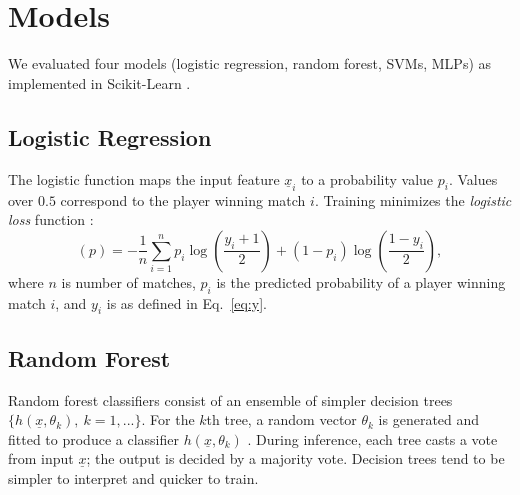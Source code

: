 \section{Models} \label{sec:models}

We evaluated four models (logistic regression, random forest, SVMs, MLPs) as implemented in  Scikit-Learn  \cite{pedregosa2011scikit}.

\subsection{Logistic Regression}
The logistic function maps the input feature $\underline{x}_i$ to a probability value $p_i$. Values over $0.5$ correspond to the player winning match $i$.  Training minimizes the \textit{logistic loss} function \cite{hazan2014logistic}:
\begin{equation}
    (p) = -\frac{1}{n} \sum_{i=1}^n p_i \log \left( \frac{y_i + 1}{2} \right) + (1-p_i)\log \left( \frac{1-y_i}{2} \right), 
\end{equation}
where $n$ is number of matches, $p_i$ is the predicted probability of a player winning match $i$, and  $y_i$ is as defined in Eq.~\ref{eq:y}. 


\subsection{Random Forest}
Random forest classifiers consist of an ensemble of simpler decision trees $\{h(\underline{x},\theta_k),\ k=1,...\}$. %
For the $k$th tree, a random vector $\theta_k$ is generated and fitted to produce a classifier $h(\underline{x}, \theta_k)$ \cite{breiman2001random}. During inference, each tree  casts a vote from input $\underline{x}$; the output is decided by a majority vote. Decision trees tend to be simpler to interpret and quicker to train.

